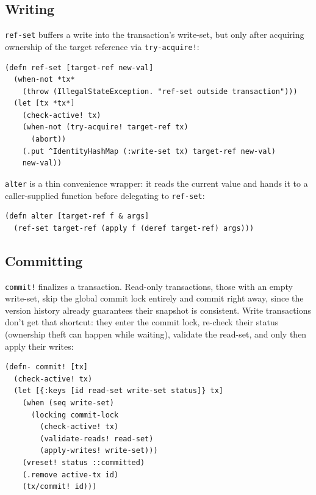 \subsection{Writing}

\texttt{ref-set} buffers a write into the transaction's write-set, but only
after acquiring ownership of the target reference via \texttt{try-acquire!}:

\begin{listing}[H]
  \begin{verbatim}
(defn ref-set [target-ref new-val]
  (when-not *tx*
    (throw (IllegalStateException. "ref-set outside transaction")))
  (let [tx *tx*]
    (check-active! tx)
    (when-not (try-acquire! target-ref tx)
      (abort))
    (.put ^IdentityHashMap (:write-set tx) target-ref new-val)
    new-val))
\end{verbatim}
  \caption{Transactional write. Ownership must be acquired before buffering;
    failure to acquire triggers an immediate abort.}
  \label{lst:ref-set}
\end{listing}

\texttt{alter} is a thin convenience wrapper: it reads the current value and
hands it to a caller-supplied function before delegating to \texttt{ref-set}:

\begin{listing}[H]
  \begin{verbatim}
(defn alter [target-ref f & args]
  (ref-set target-ref (apply f (deref target-ref) args)))
\end{verbatim}
  \caption{alter reads the current value and writes the result of applying
    \texttt{f}, reusing the ownership and buffering logic of \texttt{ref-set}.}
  \label{lst:alter}
\end{listing}

\subsection{Committing}

\texttt{commit!} finalizes a transaction. Read-only transactions, those
with an empty write-set, skip the global commit lock entirely and commit
right away, since the version history already guarantees their snapshot is
consistent. Write transactions don't get that shortcut: they enter the
commit lock, re-check their status (ownership theft can happen while
waiting), validate the read-set, and only then apply their writes:

\begin{listing}[H]
  \begin{verbatim}
(defn- commit! [tx]
  (check-active! tx)
  (let [{:keys [id read-set write-set status]} tx]
    (when (seq write-set)
      (locking commit-lock
        (check-active! tx)
        (validate-reads! read-set)
        (apply-writes! write-set)))
    (vreset! status ::committed)
    (.remove active-tx id)
    (tx/commit! id)))
\end{verbatim}
  \caption{Commit protocol. Read-only transactions skip the commit lock;
    write transactions validate reads before applying writes.}
  \label{lst:commit}
\end{listing}

